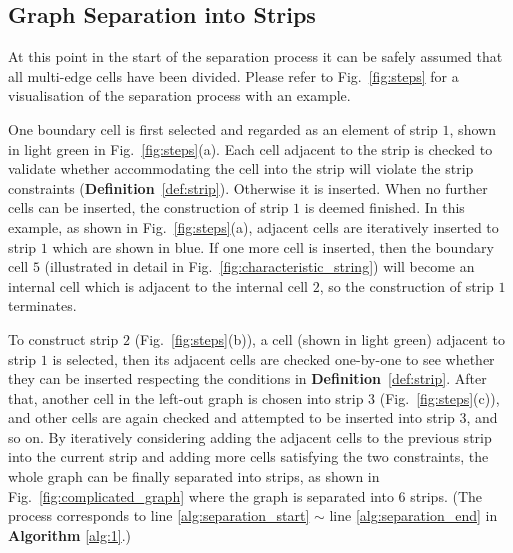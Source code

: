 \documentclass[journal]{IEEEtran}
\begin{document}


\subsection{Graph Separation into Strips}
At this point in the start of the separation process it can be safely assumed that all multi-edge cells have been divided. 
Please refer to Fig.~\ref{fig:steps} for a visualisation of the separation process with an example.

 One boundary cell is first selected and regarded as an element of strip $1$, shown in light green in Fig.~\ref{fig:steps}(a).
Each cell adjacent to the strip is checked to validate whether accommodating the cell into the strip will violate the strip constraints (\textbf{Definition}~\ref{def:strip}). Otherwise it is inserted. 
When no further cells can be inserted, the construction of strip $1$ is deemed finished. 
In this example, as shown in Fig.~\ref{fig:steps}(a), adjacent cells are iteratively inserted to strip $1$ which are shown in blue. If one more cell is inserted, then the boundary cell $5$ (illustrated in detail in Fig.~\ref{fig:characteristic_string}) will become an internal cell which is adjacent to the internal cell $2$, so the construction of strip $1$ terminates.  

To construct strip $2$ (Fig.~\ref{fig:steps}(b)), a cell (shown in light green) adjacent to strip $1$ is selected, then its adjacent cells are checked one-by-one to see whether they can be inserted respecting the conditions in \textbf{Definition}~\ref{def:strip}. 
After that, another cell in the left-out graph is chosen into strip $3$ (Fig.~\ref{fig:steps}(c)), and other cells are again checked and attempted to be inserted into strip $3$, and so on. 
By iteratively considering adding the adjacent cells to the previous strip into the current strip and adding more cells satisfying the two constraints, 
the whole graph can be finally separated into strips, as shown in Fig.~\ref{fig:complicated_graph} where the graph is separated into $6$ strips. (The process corresponds to line \ref{alg:separation_start} $\sim$ line \ref{alg:separation_end} in \textbf{Algorithm} \ref{alg:1}.) 

\end{document}
